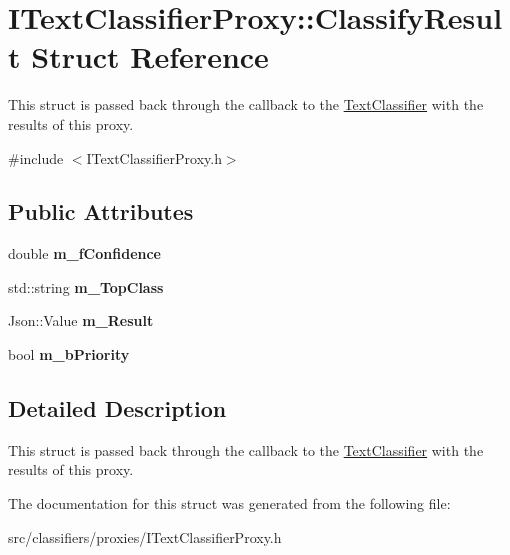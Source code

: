 \hypertarget{struct_i_text_classifier_proxy_1_1_classify_result}{}\section{I\+Text\+Classifier\+Proxy\+:\+:Classify\+Result Struct Reference}
\label{struct_i_text_classifier_proxy_1_1_classify_result}


This struct is passed back through the callback to the \hyperlink{class_text_classifier}{Text\+Classifier} with the results of this proxy.  




{\ttfamily \#include $<$I\+Text\+Classifier\+Proxy.\+h$>$}

\subsection*{Public Attributes}
\begin{DoxyCompactItemize}
\item 
\mbox{\label{struct_i_text_classifier_proxy_1_1_classify_result_a55fac4bc1e0fe33b7465ec2ef3050c42}} 
double {\bfseries m\+\_\+f\+Confidence}
\item 
\mbox{\label{struct_i_text_classifier_proxy_1_1_classify_result_a9cbd902edb0918d53bd1ec3e1337a442}} 
std\+::string {\bfseries m\+\_\+\+Top\+Class}
\item 
\mbox{\label{struct_i_text_classifier_proxy_1_1_classify_result_a511335728d2633cdff774228ab53ff1f}} 
Json\+::\+Value {\bfseries m\+\_\+\+Result}
\item 
\mbox{\label{struct_i_text_classifier_proxy_1_1_classify_result_ae12f388b801618c0e1ae9fca74b030e7}} 
bool {\bfseries m\+\_\+b\+Priority}
\end{DoxyCompactItemize}


\subsection{Detailed Description}
This struct is passed back through the callback to the \hyperlink{class_text_classifier}{Text\+Classifier} with the results of this proxy. 

The documentation for this struct was generated from the following file\+:\begin{DoxyCompactItemize}
\item 
src/classifiers/proxies/I\+Text\+Classifier\+Proxy.\+h\end{DoxyCompactItemize}
